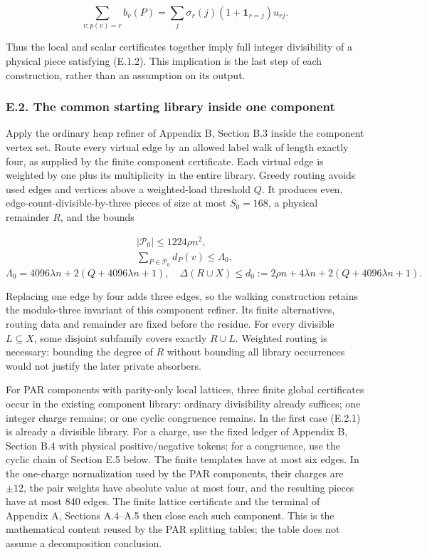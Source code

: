 \documentclass[english,11pt,a4paper]{article}
\begin{document}
\[\sum_{v:p(v)=r}b_v(P)
=\sum_j\sigma_r(j)(1+\mathbf1_{r=j})u_{rj}.
\tag{E.1.3}\]

Thus the local and scalar certificates together imply full integer divisibility of a physical piece satisfying (E.1.2). This implication is the last step of each construction, rather than an assumption on its output.

\subsubsection{E.2. The common starting library inside one component}\label{e.2.-the-common-starting-library-inside-one-component}

Apply the ordinary heap refiner of Appendix B, Section B.3 inside the component vertex set. Route every virtual edge by an allowed label walk of length exactly four, as supplied by the finite component certificate. Each virtual edge is weighted by one plus its multiplicity in the entire library. Greedy routing avoids used edges and vertices above a weighted-load threshold \(Q\). It produces even, edge-count-divisible-by-three pieces of size at most \(S_0=168\), a physical remainder \(R\), and the bounds

\[\begin{gathered}
|\mathcal P_0|\le1224\rho n^2,\\
\sum_{P\in\mathcal P_0}d_P(v)\le\Lambda_0,
\end{gathered}\] \[\Lambda_0=4096\lambda n+2(Q+4096\lambda n+1),
\quad
\Delta(R\cup X)\le d_0:=2\rho n+4\lambda n+2(Q+4096\lambda n+1).
\tag{E.2.1}\]

Replacing one edge by four adds three edges, so the walking construction retains the modulo-three invariant of this component refiner. Its finite alternatives, routing data and remainder are fixed before the residue. For every divisible \(L\subseteq X\), some disjoint subfamily covers exactly \(R\cup L\). Weighted routing is necessary: bounding the degree of \(R\) without bounding all library occurrences would not justify the later private absorbers.

For PAR components with parity-only local lattices, three finite global certificates occur in the existing component library: ordinary divisibility already suffices; one integer charge remains; or one cyclic congruence remains. In the first case (E.2.1) is already a divisible library. For a charge, use the fixed ledger of Appendix B, Section B.4 with physical positive/negative tokens; for a congruence, use the cyclic chain of Section E.5 below. The finite templates have at most six edges. In the one-charge normalization used by the PAR components, their charges are \(\pm12\), the pair weights have absolute value at most four, and the resulting pieces have at most 840 edges. The finite lattice certificate and the terminal of Appendix A, Sections A.4--A.5 then close each such component. This is the mathematical content reused by the PAR splitting tables; the table does not assume a decomposition conclusion.
\end{document}
